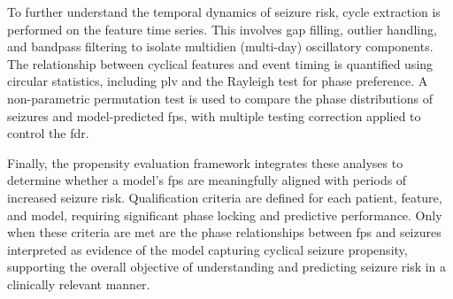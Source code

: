 To further understand the temporal dynamics of seizure risk, cycle extraction is performed on the feature time series.
This involves gap filling, outlier handling, and bandpass filtering to isolate multidien (multi-day) oscillatory components.
The relationship between cyclical features and event timing is quantified using circular statistics, including \gls{plv} and the Rayleigh test for phase preference.
A non-parametric permutation test is used to compare the phase distributions of seizures and model-predicted \glspl{fp}, with multiple testing correction applied to control the \gls{fdr}.

Finally, the propensity evaluation framework integrates these analyses to determine whether a model’s \glspl{fp} are meaningfully aligned with periods of increased seizure risk.
Qualification criteria are defined for each patient, feature, and model, requiring significant phase locking and predictive performance.
Only when these criteria are met are the phase relationships between \glspl{fp} and seizures interpreted as evidence of the model capturing cyclical seizure propensity, supporting the overall objective of understanding and predicting seizure risk in a clinically relevant manner.
